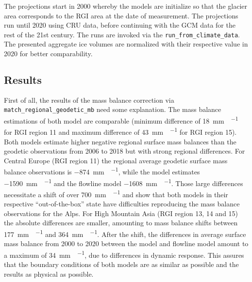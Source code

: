       The projections start in 2000 whereby the models are initialize so that the glacier area corresponds to the RGI area at the date of measurement. The projections run until 2020 using CRU data, before continuing with the GCM data for the rest of the 21st century. The runs are invoked via the \lstinline`run_from_climate_data`. The presented aggregate ice volumes are normalized with their respective value in 2020 for better comparability.
    

    \subsection{Results} %
    \label{sub:results_projection}


      First of all, the results of the mass balance correction via \lstinline`match_regional_geodetic_mb` need some explanation. The mass balance estimations of both model are comparable (minimum difference of \SI{18}{\milli\meter\waterequivalent\per\year} for RGI region 11 and maximum difference of \SI{43}{\milli\meter\waterequivalent\per\year} for RGI region 15). Both models estimate higher negative regional surface mass balances than the geodetic observations from 2006 to 2018 \citep{Hugonnet2020} but with strong regional differences. For Central Europe (RGI region 11) the regional average geodetic surface mass balance observations is \SI{-874}{\milli\metre\waterequivalent\per\year}, while the \vas{} model estimates \SI{-1590}{\milli\metre\waterequivalent\per\year} and the flowline model \SI{-1608}{\milli\metre\waterequivalent\per\year}. Those large differences necessitate a shift of over \SI{700}{\milli\metre\waterequivalent\per\year} and show that both models in their respective ``out-of-the-box'' state have difficulties reproducing the mass balance observations for the Alps. For High Mountain Asia (RGI region 13, 14 and 15) the absolute differences are smaller, amounting to mass balance shifts between \SI{177}{\milli\metre\waterequivalent\per\year} and \SI{364}{\milli\metre\waterequivalent\per\year}. After the shift, the differences in average surface mass balance from 2000 to 2020 between the \vas{} model and flowline model amount to a maximum of \SI{34}{\milli\metre\waterequivalent\per\year}, due to differences in dynamic response. This assures that the boundary conditions of both models are as similar as possible and the results as physical as possible.

